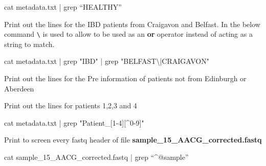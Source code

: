 \documentclass[
  letterpaper,
  DIV=11,
  numbers=noendperiod]{scrreprt}
\newenvironment{Shaded}{\begin{snugshade}}{\end{snugshade}}
\newcommand{\AttributeTok}[1]{\textcolor[rgb]{0.40,0.45,0.13}{#1}}
\newcommand{\FunctionTok}[1]{\textcolor[rgb]{0.28,0.35,0.67}{#1}}
\newcommand{\KeywordTok}[1]{\textcolor[rgb]{0.00,0.23,0.31}{#1}}
\newcommand{\NormalTok}[1]{\textcolor[rgb]{0.00,0.23,0.31}{#1}}
\newcommand{\StringTok}[1]{\textcolor[rgb]{0.13,0.47,0.30}{#1}}
\begin{document}
\begin{Shaded}
\begin{Highlighting}[]
\FunctionTok{cat}\NormalTok{ metadata.txt }\KeywordTok{|} \FunctionTok{grep}\NormalTok{ “HEALTHY”}
\end{Highlighting}
\end{Shaded}

Print out the lines for the IBD patients from Craigavon and Belfast. In
the below command \texttt{\textbackslash{}} is used to allow
\texttt{\textbar{}} to be used as an \textbf{or} operator instead of
acting as a string to match.

\begin{Shaded}
\begin{Highlighting}[]
\FunctionTok{cat}\NormalTok{ metadata.txt }\KeywordTok{|} \FunctionTok{grep} \StringTok{"IBD"} \KeywordTok{|} \FunctionTok{grep} \StringTok{"BELFAST\textbackslash{}|CRAIGAVON"}
\end{Highlighting}
\end{Shaded}

Print out the lines for the Pre information of patients not from
Edinburgh or Aberdeen

\begin{Shaded}
\end{Shaded}

Print out the lines for patients 1,2,3 and 4

\begin{Shaded}
\begin{Highlighting}[]
\FunctionTok{cat}\NormalTok{ metadata.txt }\KeywordTok{|} \FunctionTok{grep} \StringTok{"Patient\_[1{-}4][\^{}0{-}9]"} 
\end{Highlighting}
\end{Shaded}

Print to screen every fastq header of file
\textbf{sample\_15\_AACG\_corrected.fastq}

\begin{Shaded}
\begin{Highlighting}[]
\FunctionTok{cat}\NormalTok{ sample\_15\_AACG\_corrected.fastq }\KeywordTok{|} \FunctionTok{grep}\NormalTok{ “\^{}@sample”}
\end{Highlighting}
\end{Shaded}
\end{document}
